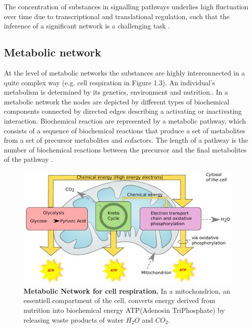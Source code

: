 The concentration of substances in signalling pathways underlies high fluctuation over time due to transcriptional and translational regulation, such that the inference of a significant network is a challenging task \citep{Kestler.2008, Oates.2012}.

\subsection*{Metabolic network}

At the level of metabolic networks the substances are highly interconnected in a quite complex way (e.g. cell respiration in Figure 1.3). An individual's metabolism is determined by its genetics, environment and nutrition.\citep{Shmulevich.2002}. In a metabolic network the nodes are depicted by different types of biochemical components connected by directed edges describing a activating or inactivating interaction. Biochemical reaction are represented by a metabolic pathway, which consists of a sequence of biochemical reactions that produce a set of metabolites from a set of precursor metabolites and cofactors. The length of a pathway is the number of biochemical reactions between the precursor and the final metabolites of the pathway \citep{Shmulevich.2003}. 

\begin{figure}
\begin{minipage}{0.65\linewidth}
\includegraphics[width=1.0\textwidth]{./Bilder/metabolic.pdf}
\end{minipage}
\caption[Metabolic Network for cell respiration]{\textbf{Metabolic Network for cell respiration. } In a mitochondrion, an essentiell compartment of the cell, converts energy derived from nutrition into biochemical energy \gls{ATP}(Adenosin TriPhosphate) by releasing waste products of water $H_{2}O$ and $CO_{2}$.}
\label{fig:Fig.3.}
\end{figure} 
\citep{cellrespiration}


